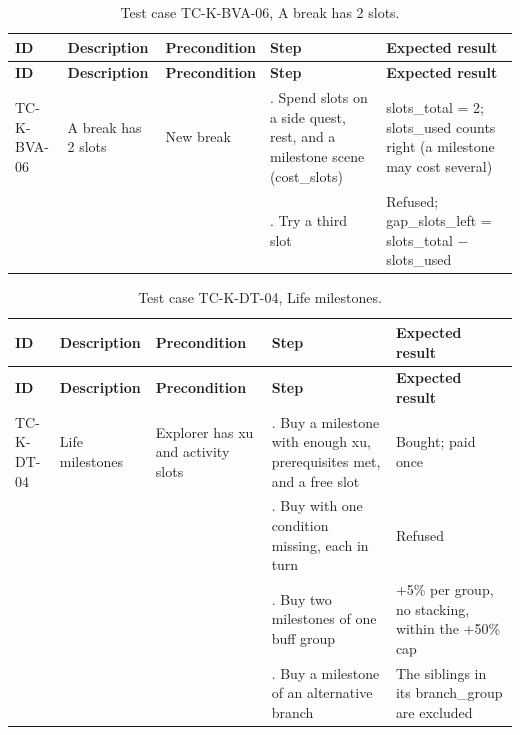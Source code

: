{\small
\begin{longtable}{|>{\raggedright\arraybackslash}p{}|>{\raggedright\arraybackslash}p{}|>{\raggedright\arraybackslash}p{}|>{\raggedright\arraybackslash}p{}|>{\raggedright\arraybackslash}p{}|}
\caption{Test case TC-K-BVA-06, A break has 2 slots.} \\
\hline
\textbf{ID} & \textbf{Description} & \textbf{Precondition} & \textbf{Step} & \textbf{Expected result} \\ \hline
\endfirsthead
\hline
\textbf{ID} & \textbf{Description} & \textbf{Precondition} & \textbf{Step} & \textbf{Expected result} \\ \hline
\endhead
TC-K-BVA-06 & A break has 2 slots & New break & 1. Spend slots on a side quest, rest, and a milestone scene (cost\_slots) & slots\_total = 2; slots\_used counts right (a milestone may cost several) \\ \hline
 &  &  & 2. Try a third slot & Refused; gap\_slots\_left = slots\_total $-$ slots\_used \\ \hline
\end{longtable}
}

{\small
\begin{longtable}{|>{\raggedright\arraybackslash}p{}|>{\raggedright\arraybackslash}p{}|>{\raggedright\arraybackslash}p{}|>{\raggedright\arraybackslash}p{}|>{\raggedright\arraybackslash}p{}|}
\caption{Test case TC-K-DT-04, Life milestones.} \\
\hline
\textbf{ID} & \textbf{Description} & \textbf{Precondition} & \textbf{Step} & \textbf{Expected result} \\ \hline
\endfirsthead
\hline
\textbf{ID} & \textbf{Description} & \textbf{Precondition} & \textbf{Step} & \textbf{Expected result} \\ \hline
\endhead
TC-K-DT-04 & Life milestones & Explorer has xu and activity slots & 1. Buy a milestone with enough xu, prerequisites met, and a free slot & Bought; paid once \\ \hline
 &  &  & 2. Buy with one condition missing, each in turn & Refused \\ \hline
 &  &  & 3. Buy two milestones of one buff group & +5\% per group, no stacking, within the +50\% cap \\ \hline
 &  &  & 4. Buy a milestone of an alternative branch & The siblings in its branch\_group are excluded \\ \hline
\end{longtable}
}


